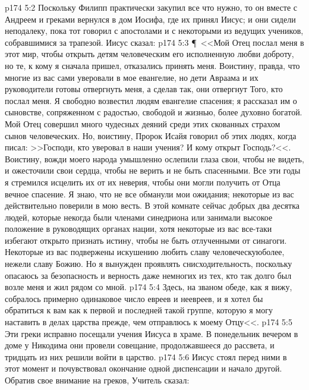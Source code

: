 \vs p174 5:2 Поскольку Филипп практически закупил все что нужно, то он вместе с Андреем и греками вернулся в дом Иосифа, где их принял Иисус; и они сидели неподалеку, пока тот говорил с апостолами и с некоторыми из ведущих учеников, собравшимися за трапезой. Иисус сказал:
\vs p174 5:3 \P\ <<Мой Отец послал меня в этот мир, чтобы открыть детям человеческим его исполненную любви доброту, но те, к кому я сначала пришел, отказались принять меня. Воистину, правда, что многие из вас сами уверовали в мое евангелие, но дети Авраама и их руководители готовы отвергнуть меня, а сделав так, они отвергнут Того, кто послал меня. Я свободно возвестил людям евангелие спасения; я рассказал им о сыновстве, сопряженном с радостью, свободой и жизнью, более духовно богатой. Мой Отец совершил много чудесных деяний среди этих скованных страхом сынов человеческих. Но, воистину, Пророк Исайя говорил об этих людях, когда писал: >>Господи, кто уверовал в наши учения? И кому открыт Господь?<<. Воистину, вожди моего народа умышленно ослепили глаза свои, чтобы не видеть, и ожесточили свои сердца, чтобы не верить и не быть спасенными. Все эти годы я стремился исцелить их от их неверия, чтобы они могли получить от Отца вечное спасение. Я знаю, что не все обманули мои ожидания; некоторые из вас действительно поверили в мою весть. В этой комнате сейчас добрых два десятка людей, которые некогда были членами синедриона или занимали высокое положение в руководящих органах нации, хотя некоторые из вас все\hyp{}таки избегают открыто признать истину, чтобы не быть отлученными от синагоги. Некоторые из вас подвержены искушению любить славу человеческуюболее, нежели славу Божию. Но я вынужден проявлять снисходительность, поскольку опасаюсь за безопасность и верность даже немногих из тех, кто так долго был возле меня и жил рядом со мной.
\vs p174 5:4 Здесь, на званом обеде, как я вижу, собралось примерно одинаковое число евреев и неевреев, и я хотел бы обратиться к вам как к первой и последней такой группе, которую я могу наставить в делах царства прежде, чем отправлюсь к моему Отцу<<.
\vs p174 5:5 Эти греки исправно посещали учения Иисуса в храме. В понедельник вечером в доме у Никодима они провели совещание, продолжавшееся до рассвета, и тридцать из них решили войти в царство.
\vs p174 5:6 Иисус стоял перед ними в этот момент и почувствовал окончание одной диспенсации и начало другой. Обратив свое внимание на греков, Учитель сказал:
